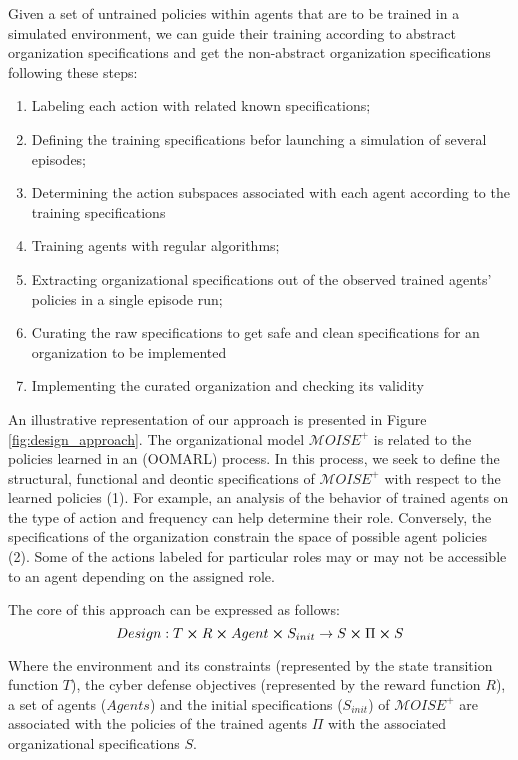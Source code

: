 \documentclass[runningheads]{llncs}
\begin{document}
Given a set of untrained policies within agents that are to be trained in a simulated environment, we can guide their training according to abstract organization specifications and get the non-abstract organization specifications following these steps:
\begin{enumerate}
  \item Labeling each action with related known specifications;
  \item Defining the training specifications befor launching a simulation of several episodes;
  \item Determining the action subspaces associated with each agent according to the training specifications
  \item Training agents with regular algorithms;
  \item Extracting organizational specifications out of the observed trained agents' policies in a single episode run;
  \item Curating the raw specifications to get safe and clean specifications for an organization to be implemented
  \item Implementing the curated organization and checking its validity
\end{enumerate}

An illustrative representation of our approach is presented in Figure \ref{fig:design_approach}. The organizational model $\mathcal{M}OISE^{+}$ is related to the policies learned in an  (OOMARL) process. In this process, we seek to define the structural, functional and deontic specifications of $\mathcal{M}OISE^{+}$ with respect to the learned policies (1). For example, an analysis of the behavior of trained agents on the type of action and frequency can help determine their role. Conversely, the specifications of the organization constrain the space of possible agent policies (2). Some of the actions labeled for particular roles may or may not be accessible to an agent depending on the assigned role.

The core of this approach can be expressed as follows:\begin{equation} %
  Design: T \cross R \cross Agent \cross S_{init} \rightarrow S \cross \Pi \cross S
\end{equation}

Where the environment and its constraints (represented by the state transition function $T$), the cyber defense objectives (represented by the reward function $R$), a set of agents ($Agents$) and the initial specifications ($S_{init}$) of $\mathcal{M}OISE^{+}$ are associated with the policies of the trained agents $\Pi$ with the associated organizational specifications $S$.
\end{document}
